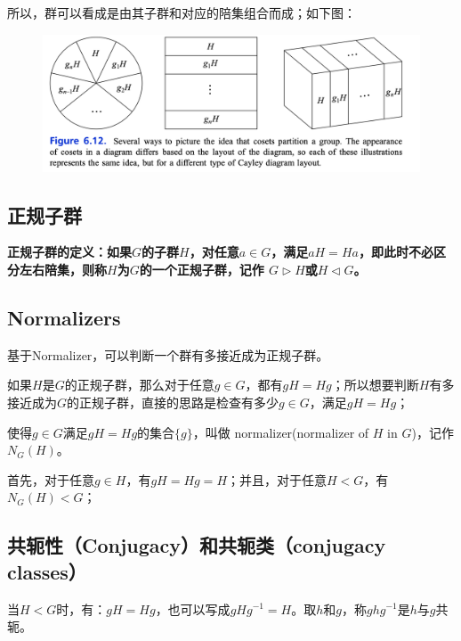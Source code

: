 \documentclass[12pt]{article}
\begin{document}
所以，群可以看成是由其子群和对应的陪集组合而成；如下图：
\begin{figure}[H]
    \centering
    \includegraphics[width=1\textwidth]{fig/Group/Group-Decomposition.png}
\end{figure}


\subsection{正规子群}
\begin{mdframed}[
linecolor=black!40,outerlinewidth=1pt,roundcorner=.5em,innertopmargin=1ex,innerbottommargin=.5\baselineskip,innerrightmargin=1em,innerleftmargin=1em,backgroundcolor=gray!5,
]
\textbf{
正规子群的定义：如果$G$的子群$H$，对任意$a \in G$，满足$aH = Ha$，即此时不必区分左右陪集，则称$H$为$G$的一个正规子群，记作 $G \rhd H$或$H \lhd G$。
}
\end{mdframed}

\subsection{Normalizers}
基于Normalizer，可以判断一个群有多接近成为正规子群。

如果$H$是$G$的正规子群，那么对于任意$g \in G$，都有$gH = Hg$；所以想要判断$H$有多接近成为$G$的正规子群，直接的思路是检查有多少$g \in G$，满足$gH = Hg$；

使得$g \in G$满足$gH = Hg$的集合$\{g\}$，叫做 normalizer(normalizer of $H$ in $G$)，记作$N_G(H)$。

首先，对于任意$g \in H$，有$gH = Hg = H$；并且，对于任意$H < G$，有$N_G(H) < G$；

\subsection{共轭性（Conjugacy）和共轭类（conjugacy classes）}
当$H < G$时，有：$gH = Hg$，也可以写成$gHg^{-1} = H$。取$h$和$g$，称$ghg^{-1} $是$h$与$g$共轭。
\end{document}
